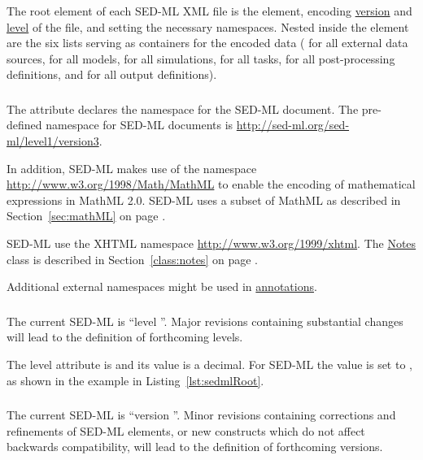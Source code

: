 The root element of each SED-ML XML file is the  element, encoding \hyperref[sec:version]{version} and \hyperref[sec:level]{level} of the file, and setting the necessary namespaces. Nested inside the  element are the six lists serving as containers for the encoded data ( for all external data sources,  for all models,  for all simulations,  for all tasks,  for all post-processing definitions, and  for all output definitions).

\subsubsection{}
\label{sec:xmlns}
The  attribute declares the namespace for the SED-ML document. The pre-defined namespace for SED-ML documents is \url{http://sed-ml.org/sed-ml/level1/version3}. 

In addition, SED-ML makes use of the  namespace \url{http://www.w3.org/1998/Math/MathML} to enable the encoding of mathematical expressions in MathML 2.0. SED-ML uses a subset of MathML as described in Section~\ref{sec:mathML} on page \pageref{sec:mathML}.

SED-ML  use the XHTML namespace \url{http://www.w3.org/1999/xhtml}.  The \hyperref[class:notes]{Notes} class is described in Section~\ref{class:notes} on page \pageref{class:notes}.

Additional external namespaces might be used in \hyperref[class:annotation]{annotations}. 

\subsubsection{}
\label{sec:level}
The current SED-ML  is ``level \level''. Major revisions containing substantial changes will lead to the definition of forthcoming levels.

The level attribute is  and its value is a  decimal. For SED-ML \currentLV the value is set to , as shown in the example in Listing~\ref{lst:sedmlRoot}.

\subsubsection{}
\label{sec:version}
The current SED-ML  is ``version \version''. Minor revisions containing corrections and refinements of SED-ML elements, or new constructs which do not affect backwards compatibility, will lead to the definition of forthcoming versions.

